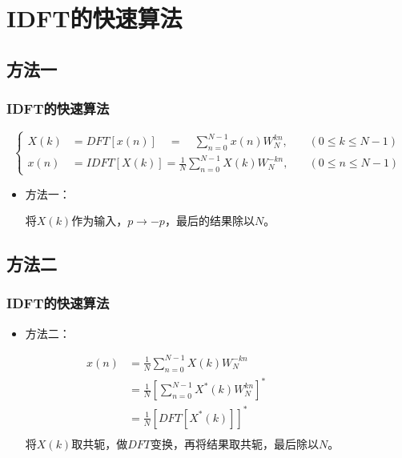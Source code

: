 \documentclass[notheorems,compress,mathserif,table]{beamer}
\begin{document}
\section{IDFT的快速算法}
\subsection{方法一}
\begin{frame}\frametitle{IDFT的快速算法}%
$$
\left \{
\begin{aligned}
    X(k)&= DFT[x(n)]\quad  = \quad\sum_{n=0}^{N-1}x(n)W_{N}^{kn}, &\quad (0\leq k\leq N-1)\\
    x(n)&= IDFT[X(k)] =\frac{1}{N}\sum_{n=0}^{N-1}X(k)W_{N}^{-kn},&\quad (0\leq n\leq N-1)
\end{aligned}
\right.
$$

\begin{itemize}
  \item  方法一： \par

        将$X(k)$作为输入，$p\rightarrow -p$，最后的结果除以$N$。
\end{itemize}
\end{frame}

\subsection{方法二}
\begin{frame}\frametitle{IDFT的快速算法}%
\begin{itemize}
  \item 方法二： \par
        \begin{equation}
        \begin{split}
        x(n)&= \frac{1}{N}\sum_{n=0}^{N-1}X(k)W_{N}^{-kn} \quad\quad\quad\quad\quad\quad\quad\quad\quad\\
            &= \frac{1}{N}\left[\sum_{n=0}^{N-1}X^*(k)W_{N}^{kn} \right]^*\\
            &= \frac{1}{N}\left[DFT[X^*(k)]\right]^*\\
        \end{split}
        \end{equation}
        将$X(k)$取共轭，做$DFT$变换，再将结果取共轭，最后除以$N$。
\end{itemize}

\end{frame}



\end{document}
